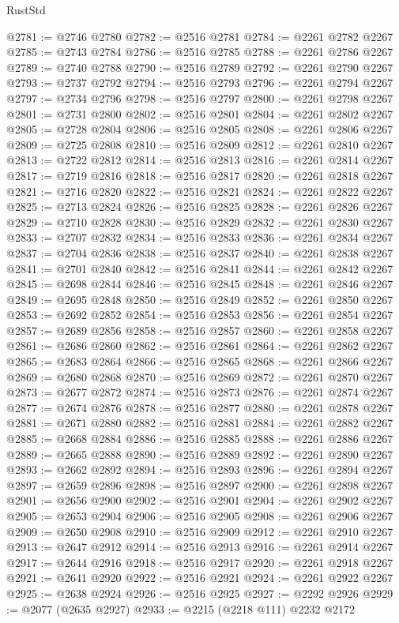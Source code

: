 \begin{lexlean}{RustStd}
\begin{coremodule}
@2781 := @2746 @2780
@2782 := @2516 @2781
@2784 := @2261 @2782 @2267
@2785 := @2743 @2784
@2786 := @2516 @2785
@2788 := @2261 @2786 @2267
@2789 := @2740 @2788
@2790 := @2516 @2789
@2792 := @2261 @2790 @2267
@2793 := @2737 @2792
@2794 := @2516 @2793
@2796 := @2261 @2794 @2267
@2797 := @2734 @2796
@2798 := @2516 @2797
@2800 := @2261 @2798 @2267
@2801 := @2731 @2800
@2802 := @2516 @2801
@2804 := @2261 @2802 @2267
@2805 := @2728 @2804
@2806 := @2516 @2805
@2808 := @2261 @2806 @2267
@2809 := @2725 @2808
@2810 := @2516 @2809
@2812 := @2261 @2810 @2267
@2813 := @2722 @2812
@2814 := @2516 @2813
@2816 := @2261 @2814 @2267
@2817 := @2719 @2816
@2818 := @2516 @2817
@2820 := @2261 @2818 @2267
@2821 := @2716 @2820
@2822 := @2516 @2821
@2824 := @2261 @2822 @2267
@2825 := @2713 @2824
@2826 := @2516 @2825
@2828 := @2261 @2826 @2267
@2829 := @2710 @2828
@2830 := @2516 @2829
@2832 := @2261 @2830 @2267
@2833 := @2707 @2832
@2834 := @2516 @2833
@2836 := @2261 @2834 @2267
@2837 := @2704 @2836
@2838 := @2516 @2837
@2840 := @2261 @2838 @2267
@2841 := @2701 @2840
@2842 := @2516 @2841
@2844 := @2261 @2842 @2267
@2845 := @2698 @2844
@2846 := @2516 @2845
@2848 := @2261 @2846 @2267
@2849 := @2695 @2848
@2850 := @2516 @2849
@2852 := @2261 @2850 @2267
@2853 := @2692 @2852
@2854 := @2516 @2853
@2856 := @2261 @2854 @2267
@2857 := @2689 @2856
@2858 := @2516 @2857
@2860 := @2261 @2858 @2267
@2861 := @2686 @2860
@2862 := @2516 @2861
@2864 := @2261 @2862 @2267
@2865 := @2683 @2864
@2866 := @2516 @2865
@2868 := @2261 @2866 @2267
@2869 := @2680 @2868
@2870 := @2516 @2869
@2872 := @2261 @2870 @2267
@2873 := @2677 @2872
@2874 := @2516 @2873
@2876 := @2261 @2874 @2267
@2877 := @2674 @2876
@2878 := @2516 @2877
@2880 := @2261 @2878 @2267
@2881 := @2671 @2880
@2882 := @2516 @2881
@2884 := @2261 @2882 @2267
@2885 := @2668 @2884
@2886 := @2516 @2885
@2888 := @2261 @2886 @2267
@2889 := @2665 @2888
@2890 := @2516 @2889
@2892 := @2261 @2890 @2267
@2893 := @2662 @2892
@2894 := @2516 @2893
@2896 := @2261 @2894 @2267
@2897 := @2659 @2896
@2898 := @2516 @2897
@2900 := @2261 @2898 @2267
@2901 := @2656 @2900
@2902 := @2516 @2901
@2904 := @2261 @2902 @2267
@2905 := @2653 @2904
@2906 := @2516 @2905
@2908 := @2261 @2906 @2267
@2909 := @2650 @2908
@2910 := @2516 @2909
@2912 := @2261 @2910 @2267
@2913 := @2647 @2912
@2914 := @2516 @2913
@2916 := @2261 @2914 @2267
@2917 := @2644 @2916
@2918 := @2516 @2917
@2920 := @2261 @2918 @2267
@2921 := @2641 @2920
@2922 := @2516 @2921
@2924 := @2261 @2922 @2267
@2925 := @2638 @2924
@2926 := @2516 @2925
@2927 := @2292 @2926
@2929 := @2077 (@2635 @2927)
@2933 := @2215 (@2218 @111) @2232 @2172

\end{coremodule}
\end{lexlean}
